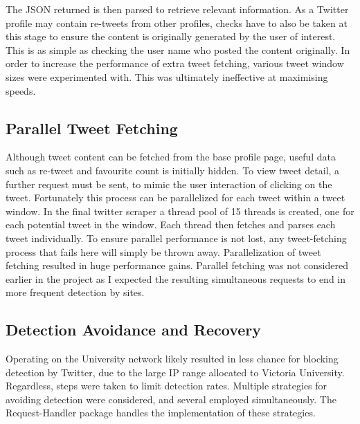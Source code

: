 % 

The JSON returned is then parsed to retrieve relevant information. As a Twitter profile may contain re-tweets from other profiles, checks have to also be taken at this stage to ensure the content is originally generated by the user of interest. This is as simple as checking the user name who posted the content originally. In order to increase the performance of extra tweet fetching, various tweet window sizes were experimented with. This was ultimately ineffective at maximising speeds.

\subsection{Parallel Tweet Fetching}

Although tweet content can be fetched from the base profile page, useful data such as re-tweet and favourite count is initially hidden. To view tweet detail, a further request must be sent, to mimic the user interaction of clicking on the tweet. Fortunately this process can be parallelized for each tweet within a tweet window. In the final twitter scraper a thread pool of 15 threads is created, one for each potential tweet in the window. Each thread then fetches and parses each tweet individually. To ensure parallel performance is not lost, any tweet-fetching process that fails here will simply be thrown away. Parallelization of tweet fetching resulted in huge performance gains. Parallel fetching was not considered earlier in the project as I expected the resulting simultaneous requests to end in more frequent detection by sites. 

\subsection{Detection Avoidance and Recovery}

Operating on the University network likely resulted in less chance for blocking detection by Twitter, due to the large IP range allocated to Victoria University. Regardless, steps were taken to limit detection rates. Multiple strategies for avoiding detection were considered, and several employed simultaneously. The Request-Handler package handles the implementation of these strategies.


